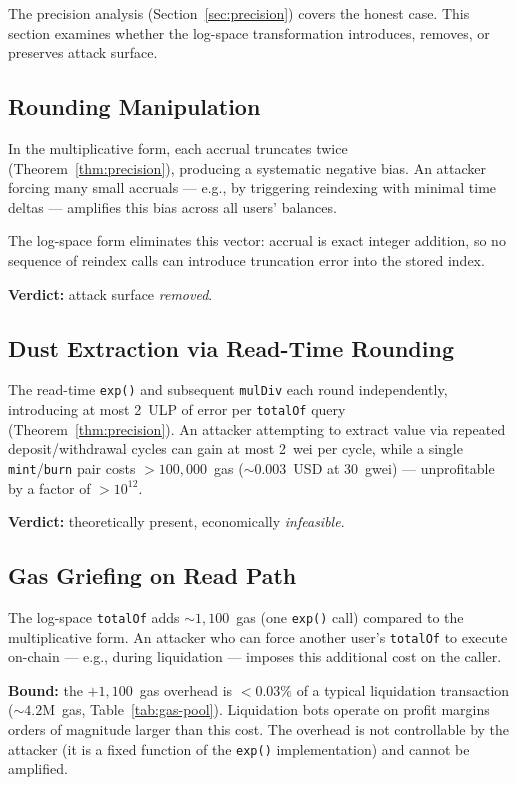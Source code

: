 \documentclass[10pt,a4paper,twocolumn]{article}
\begin{document}
The precision analysis (Section~\ref{sec:precision}) covers the honest case. This section examines whether the log-space transformation introduces, removes, or preserves attack surface.

\subsection{Rounding Manipulation}
\label{subsec:rounding-attack}

In the multiplicative form, each accrual truncates twice (Theorem~\ref{thm:precision}), producing a systematic negative bias. An attacker forcing many small accruals --- e.g., by triggering reindexing with minimal time deltas --- amplifies this bias across all users' balances.

The log-space form eliminates this vector: accrual is exact integer addition, so no sequence of reindex calls can introduce truncation error into the stored index.

\textbf{Verdict:} attack surface \emph{removed}.

\subsection{Dust Extraction via Read-Time Rounding}
\label{subsec:dust-attack}

The read-time \texttt{exp()} and subsequent \texttt{mulDiv} each round independently, introducing at most 2~ULP of error per \texttt{totalOf} query (Theorem~\ref{thm:precision}). An attacker attempting to extract value via repeated deposit/withdrawal cycles can gain at most 2~wei per cycle, while a single \texttt{mint}/\texttt{burn} pair costs $>100{,}000$~gas (${\sim}0.003$~USD at 30~gwei) --- unprofitable by a factor of $>10^{12}$.

\textbf{Verdict:} theoretically present, economically \emph{infeasible}.

\subsection{Gas Griefing on Read Path}
\label{subsec:gas-grief}

The log-space \texttt{totalOf} adds ${\sim}1{,}100$~gas (one \texttt{exp()} call) compared to the multiplicative form. An attacker who can force another user's \texttt{totalOf} to execute on-chain --- e.g., during liquidation --- imposes this additional cost on the caller.

\textbf{Bound:} the $+1{,}100$~gas overhead is $<0.03\%$ of a typical liquidation transaction (${\sim}4.2$M~gas, Table~\ref{tab:gas-pool}). Liquidation bots operate on profit margins orders of magnitude larger than this cost. The overhead is not controllable by the attacker (it is a fixed function of the \texttt{exp()} implementation) and cannot be amplified.
\end{document}
